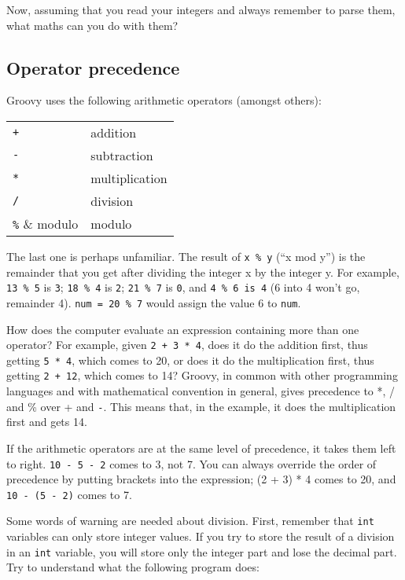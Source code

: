 
Now, assuming that you read your integers and always remember to parse
them, what maths can you do with them?

\subsection{Operator precedence}
\label{sec:prec}

Groovy uses the following arithmetic operators (amongst others):

\begin{tabular}{ll}
\verb!+! & addition\\
\verb!-! & subtraction\\
\verb!*! & multiplication\\
\verb!/! & division\\
\verb!%! & modulo\\
\end{tabular}

The last one is perhaps unfamiliar.  The result of \verb!x % y! (``x mod y'')
is the remainder that you get after dividing the integer x by the integer y.
For example, \verb!13 % 5! is \verb!3!; \verb!18 % 4! is \verb!2!; 
\verb!21 % 7! is \verb!0!, and \verb!4 % 6 is 4! (6 into 4 won't go, 
remainder 4).  \verb!num = 20 % 7! would assign the value 6
to \verb!num!.

How does the computer evaluate an expression containing more than one
operator? For example, given \verb!2 + 3 * 4!, does it do the
addition first, thus getting \verb!5 * 4!, which comes to 20, or does
it do the multiplication first, thus getting \verb!2 + 12!, which
comes to 14?  Groovy, in common with other programming languages and
with mathematical convention in general, gives precedence to *, / and
\% over + and \verb!-!.  This means that, in the example, it does the
multiplication first and gets 14.

If the arithmetic operators are at the same level of precedence, it
takes them left to right.  \verb!10 - 5 - 2! comes to 3, not 7.  You
can always override the order of precedence by putting brackets into
the expression; (2 + 3) * 4 comes to 20, and \verb!10 - (5 - 2)! comes
to 7.

Some words of warning are needed about division. First, remember that
\verb-int- variables can only store integer values. If you try to
store the result of a division in an \verb-int- variable, you will
store only the integer part and lose the decimal part. Try to
understand what the following program does:

